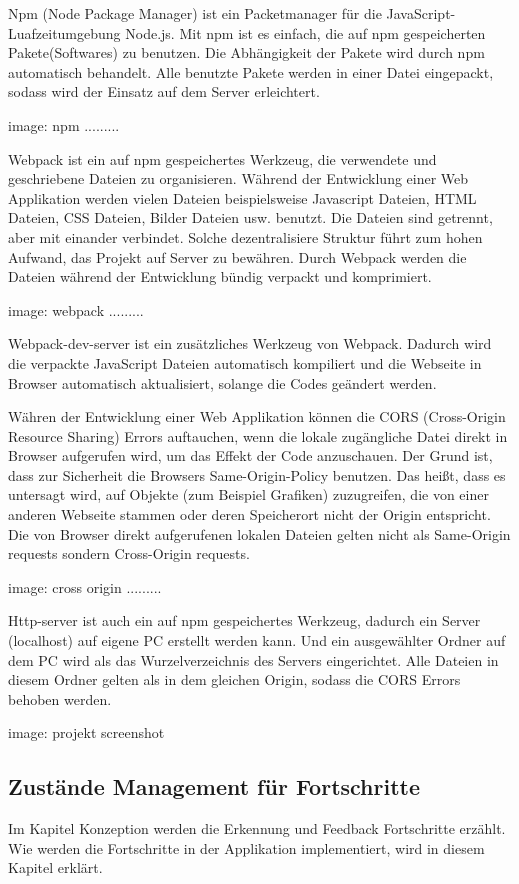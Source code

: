  Npm (Node Package Manager) ist ein Packetmanager für die JavaScript-Luafzeitumgebung Node.js. Mit npm ist es einfach, die auf npm gespeicherten Pakete(Softwares) zu benutzen. Die Abhängigkeit der Pakete wird durch npm automatisch behandelt. Alle benutzte Pakete werden in einer Datei eingepackt, sodass wird der Einsatz auf dem Server erleichtert.
 
 image: npm .........
 
 Webpack ist ein auf npm gespeichertes Werkzeug, die verwendete und geschriebene Dateien zu organisieren. Während der Entwicklung einer Web Applikation werden vielen Dateien beispielsweise Javascript Dateien, HTML Dateien, CSS Dateien, Bilder Dateien usw. benutzt. Die Dateien sind getrennt, aber mit einander verbindet. Solche dezentralisiere Struktur führt zum hohen Aufwand, das Projekt auf Server zu bewähren. Durch Webpack werden die Dateien während der Entwicklung bündig verpackt und komprimiert.
 
 image: webpack .........
 
 Webpack-dev-server ist ein zusätzliches Werkzeug von Webpack. Dadurch wird die verpackte JavaScript Dateien automatisch kompiliert und die Webseite in Browser automatisch aktualisiert, solange die Codes geändert werden.
 
 Währen der Entwicklung einer Web Applikation können die CORS (Cross-Origin Resource Sharing) Errors auftauchen, wenn die lokale zugängliche Datei direkt in Browser aufgerufen wird, um das Effekt der Code anzuschauen. Der Grund ist, dass zur Sicherheit die Browsers Same-Origin-Policy benutzen. Das heißt, dass es untersagt wird, auf Objekte (zum Beispiel Grafiken) zuzugreifen, die von einer anderen Webseite stammen oder deren Speicherort nicht der Origin entspricht. Die von Browser direkt aufgerufenen lokalen Dateien gelten nicht als Same-Origin requests sondern Cross-Origin requests.
 
 image: cross origin .........
 
 Http-server ist auch ein auf npm gespeichertes Werkzeug, dadurch ein Server (localhost) auf eigene PC erstellt werden kann. Und ein ausgewählter Ordner auf dem PC wird als das Wurzelverzeichnis des Servers eingerichtet. Alle Dateien in diesem Ordner gelten als in dem gleichen Origin, sodass die CORS Errors behoben werden.
 
 image: projekt screenshot 
 
 \subsection{Zustände Management für Fortschritte}
 Im Kapitel Konzeption werden die Erkennung und Feedback Fortschritte erzählt. Wie werden die Fortschritte in der Applikation implementiert, wird in diesem Kapitel erklärt.
 
